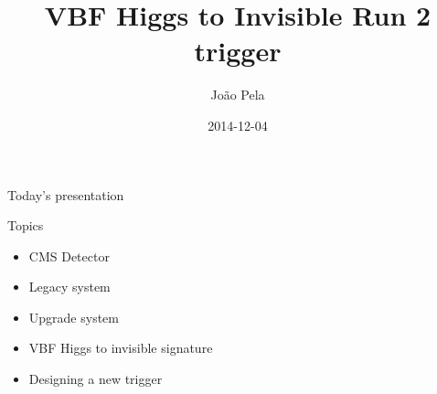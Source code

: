 \documentclass[8pt]{beamer}
\author[J. Pela]{João Pela}
\title{VBF Higgs to Invisible Run 2 trigger}
\institute[ICL]{Imperial College London}
\date{2014-12-04}
\begin{document}
\setlength{\unitlength}{1mm}

\begin{frame}
  \titlepage
\end{frame}

\begin{frame}{Today's presentation}
 
\begin{block}{Topics}
 
\begin{itemize}
  \item CMS Detector
  \item Legacy system
  \item Upgrade system
  \item VBF Higgs to invisible signature
  \item Designing a new trigger
\end{itemize}
 
\end{block}

\end{frame}
\end{document}

